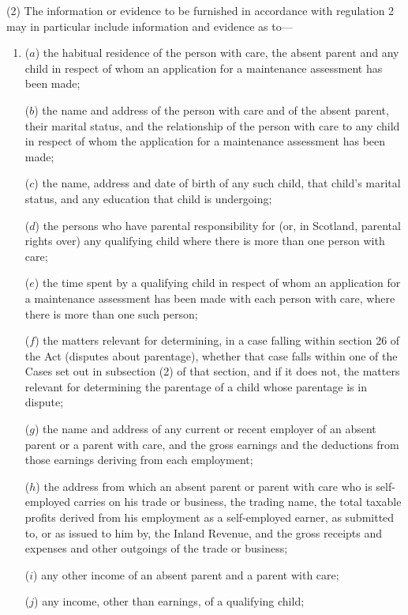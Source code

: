 \documentclass[a4paper,12pt]{article}
\begin{document}
(2) The information or evidence to be furnished in accordance with regulation 2 may in particular include information and evidence as to—
\begin{enumerate}\item[]
($a$) the habitual residence of the person with care, the absent parent and any child in respect of whom an application for a maintenance assessment has been made;

($b$) the name and address of the person with care and of the absent parent, their marital status, and the relationship of the person with care to any child in respect of whom the application for a maintenance assessment has been made;

($c$) the name, address and date of birth of any such child, that child’s marital status, and any education that child is undergoing;

($d$) the persons who have parental responsibility for (or, in Scotland, parental rights over) any qualifying child where there is more than one person with care;

($e$) the time spent by a qualifying child in respect of whom an application for a maintenance assessment has been made with each person with care, where there is more than one such person;

($f$) the matters relevant for determining, in a case falling within section 26 of the Act (disputes about parentage), whether that case falls within one of the Cases set out in subsection (2) of that section, and if it does not, the matters relevant for determining the parentage of a child whose parentage is in dispute;

($g$) the name and address of any current or recent employer of an absent parent or a parent with care, and the gross earnings and the deductions from those earnings deriving from each employment;

($h$) the address from which an absent parent or parent with care who is self-employed carries on his trade or business, the trading name, 
the total taxable profits derived from his employment as a self-employed earner, as submitted to, or as issued to him by, the Inland Revenue,  %
and the gross receipts and expenses and other outgoings of the trade or business;

($i$) any other income of an absent parent and a parent with care;

($j$) any income, other than earnings, of a qualifying child;


\end{enumerate}
\end{document}
